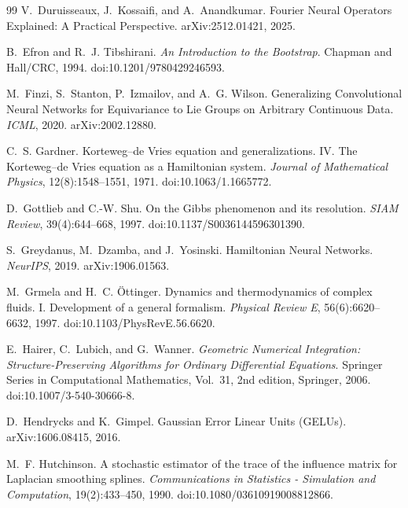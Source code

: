 \documentclass[11pt]{article}
\theoremstyle{definition}
\theoremstyle{remark}
\begin{document}
\begin{thebibliography}{99}
V.~Duruisseaux, J.~Kossaifi, and A.~Anandkumar.
\newblock Fourier Neural Operators Explained: A Practical Perspective.
\newblock arXiv:2512.01421, 2025.

B.~Efron and R.~J. Tibshirani.
\newblock \emph{An Introduction to the Bootstrap}.
\newblock Chapman and Hall/CRC, 1994. doi:10.1201/9780429246593.

M.~Finzi, S.~Stanton, P.~Izmailov, and A.~G. Wilson.
\newblock Generalizing Convolutional Neural Networks for Equivariance to Lie
Groups on Arbitrary Continuous Data.
\newblock \emph{ICML}, 2020. arXiv:2002.12880.

C.~S. Gardner.
\newblock Korteweg--de Vries equation and generalizations. IV. The
Korteweg--de Vries equation as a Hamiltonian system.
\newblock \emph{Journal of Mathematical Physics}, 12(8):1548--1551, 1971.
doi:10.1063/1.1665772.

D.~Gottlieb and C.-W. Shu.
\newblock On the {G}ibbs phenomenon and its resolution.
\newblock \emph{SIAM Review}, 39(4):644--668, 1997.
doi:10.1137/S0036144596301390.

S.~Greydanus, M.~Dzamba, and J.~Yosinski.
\newblock Hamiltonian Neural Networks.
\newblock \emph{NeurIPS}, 2019. arXiv:1906.01563.

M.~Grmela and H.~C. \"Ottinger.
\newblock Dynamics and thermodynamics of complex fluids. I. Development of a
general formalism.
\newblock \emph{Physical Review E}, 56(6):6620--6632, 1997.
doi:10.1103/PhysRevE.56.6620.

E.~Hairer, C.~Lubich, and G.~Wanner.
\newblock \emph{Geometric Numerical Integration: Structure-Preserving Algorithms
for Ordinary Differential Equations}.
\newblock Springer Series in Computational Mathematics, Vol.~31, 2nd edition,
Springer, 2006. doi:10.1007/3-540-30666-8.

D.~Hendrycks and K.~Gimpel.
\newblock Gaussian Error Linear Units ({GELU}s).
\newblock arXiv:1606.08415, 2016.

M.~F. Hutchinson.
\newblock A stochastic estimator of the trace of the influence matrix for
{L}aplacian smoothing splines.
\newblock \emph{Communications in Statistics - Simulation and Computation},
19(2):433--450, 1990. doi:10.1080/03610919008812866.


\end{thebibliography}
\end{document}
